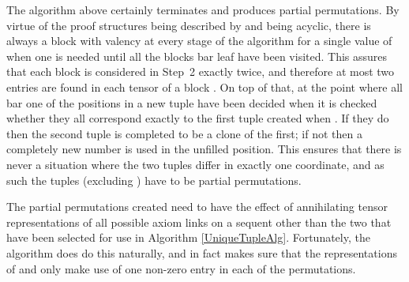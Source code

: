 \documentclass{LMCS}
\theoremstyle{plain}\newtheorem*{cLm}{Claim}
\newcommand{\p}{} \newcommand{\N}{\mathbb{N}}
\begin{document}
\noindent  The algorithm above certainly terminates and produces partial permutations. By virtue of the proof structures being described by  and  being acyclic, there is always a block with valency  at every stage of the algorithm for a single value of  when one is needed until all the blocks bar leaf  have been visited. This assures that each block is considered in Step~2 exactly twice, and therefore at most two entries are found in each tensor of a block . On top of that, at the point where all bar one of the positions in a new tuple have been decided when  it is checked whether they all correspond exactly to the first tuple created when . If they do then the second tuple is completed to be a clone of the first; if not then a completely new number is used in the unfilled position. This ensures that there is never a situation where the two tuples differ in exactly one coordinate, and as such the tuples  (excluding ) have to be partial permutations.
  
  \p The partial permutations created need to have the effect of annihilating tensor representations of all possible axiom links on a sequent other than the two that have been selected for use in Algorithm \ref{UniqueTupleAlg}. Fortunately, the algorithm does do this naturally, and in fact makes sure that the representations of  and  only make use of one non-zero entry in each of the permutations.
  
\end{document}
